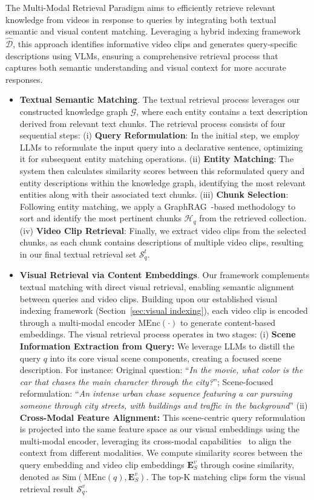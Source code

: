 The Multi-Modal Retrieval Paradigm aims to efficiently retrieve relevant knowledge from videos in response to queries by integrating both textual semantic and visual content matching. Leveraging a hybrid indexing framework $\hat{\mathcal{D}}$, this approach identifies informative video clips and generates query-specific descriptions using VLMs, ensuring a comprehensive retrieval process that captures both semantic understanding and visual context for more accurate responses.
\begin{itemize}[leftmargin=*]
    \item \textbf{Textual Semantic Matching}. The textual retrieval process leverages our constructed knowledge graph $\mathcal{G}$, where each entity contains a text description derived from relevant text chunks. The retrieval process consists of four sequential steps: (i) \textbf{Query Reformulation}: In the initial step, we employ LLMs to reformulate the input query into a declarative sentence, optimizing it for subsequent entity matching operations. (ii) \textbf{Entity Matching}: The system then calculates similarity scores between this reformulated query and entity descriptions within the knowledge graph, identifying the most relevant entities along with their associated text chunks. (iii) \textbf{Chunk Selection}: Following entity matching, we apply a GraphRAG~\cite{GraphRAG}-based methodology to sort and identify the most pertinent chunks ${\mathcal{H}}_{q}$ from the retrieved collection. (iv) \textbf{Video Clip Retrieval}: Finally, we extract video clips from the selected chunks, as each chunk contains descriptions of multiple video clips, resulting in our final textual retrieval set ${\mathcal{S}}_{q}^{t}$.    
    
    \item \textbf{Visual Retrieval via Content Embeddings}. Our framework complements textual matching with direct visual retrieval, enabling semantic alignment between queries and video clips. Building upon our established visual indexing framework (Section~\ref{sec:visual indexing}), each video clip is encoded through a multi-modal encoder $\text{MEnc}(\cdot)$ to generate content-based embeddings. The visual retrieval process operates in two stages: (i) \textbf{Scene Information Extraction from Query:} We leverage LLMs to distill the query $q$ into its core visual scene components, creating a focused scene description. For instance: Original question: ``\emph{In the movie, what color is the car that chases the main character through the city?}''; Scene-focused reformulation: ``\emph{An intense urban chase sequence featuring a car pursuing someone through city streets, with buildings and traffic in the background}'' (ii) \textbf{Cross-Modal Feature Alignment:} This scene-centric query reformulation is projected into the same feature space as our visual embeddings using the multi-modal encoder, leveraging its cross-modal capabilities~\cite{CLIP,Imgebind} to align the context from different modalities. We compute similarity scores between the query embedding and video clip embeddings $\mathbf{E}_{S}^{v}$ through cosine similarity, denoted as $\text{Sim}(\text{MEnc}(q), \mathbf{E}_{S}^{v})$. The top-K matching clips form the visual retrieval result ${\mathcal{S}}_{q}^{v}$.
    

\end{itemize}
